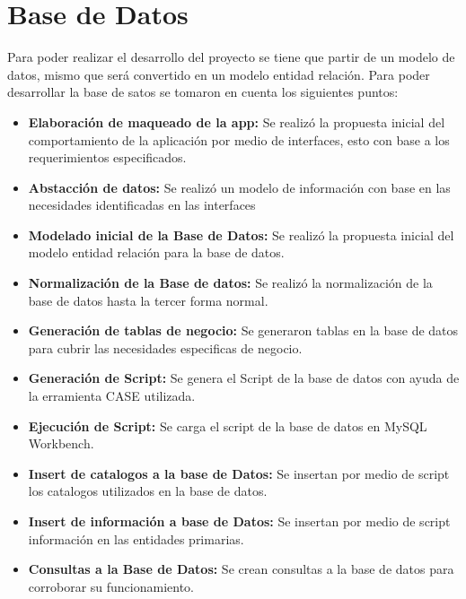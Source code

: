 
\section{Base de Datos}
Para poder realizar el desarrollo del proyecto se tiene que partir de un modelo de datos, mismo que será convertido en un modelo entidad relación. Para poder desarrollar la base de satos se tomaron en cuenta los siguientes puntos:

\begin{itemize}
	\item \textbf{Elaboración de maqueado de la app:} Se realizó la propuesta inicial del comportamiento de la aplicación por medio de interfaces, esto con base a los requerimientos especificados.
	
	\item \textbf{Abstacción de datos:} Se realizó un modelo de información con base en las necesidades identificadas en las interfaces
	
	\item \textbf{Modelado inicial de la Base de Datos:} Se realizó la propuesta inicial del modelo entidad relación para la base de datos.
	
	\item \textbf{Normalización de la Base de datos:} Se realizó la normalización de la base de datos hasta la tercer forma normal.
	
	\item \textbf{Generación de tablas de negocio:} Se generaron tablas en la base de datos para cubrir las necesidades especificas de negocio.
	
	\item \textbf{Generación de Script:} Se genera el Script de la base de datos con ayuda de la erramienta CASE utilizada.
	
	\item \textbf{Ejecución de Script:} Se carga el script de la base de datos en MySQL Workbench.
	
	\item \textbf{Insert de catalogos a la base de Datos:} Se insertan por medio de script los catalogos utilizados en la base de datos.
	
	\item \textbf{Insert de información a base de Datos:} Se insertan por medio de script información en las entidades primarias.
	
	\item \textbf{Consultas a la Base de Datos:} Se crean consultas a la base de datos para corroborar su funcionamiento.
	
	
	
\end{itemize}

